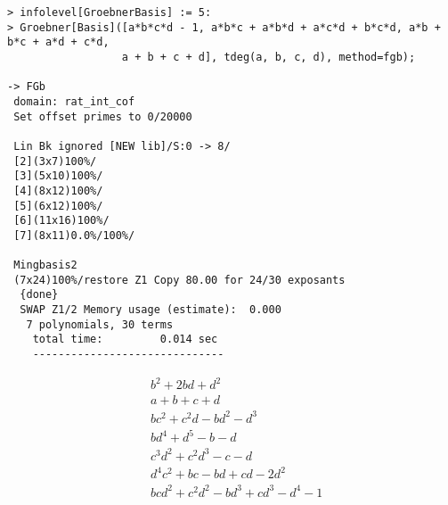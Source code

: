 \begin{Verbatim}[fontsize=\footnotesize]
> infolevel[GroebnerBasis] := 5:
> Groebner[Basis]([a*b*c*d - 1, a*b*c + a*b*d + a*c*d + b*c*d, a*b + b*c + a*d + c*d,
                  a + b + c + d], tdeg(a, b, c, d), method=fgb);

-> FGb
 domain: rat_int_cof
 Set offset primes to 0/20000

 Lin Bk ignored [NEW lib]/S:0 -> 8/
 [2](3x7)100%/
 [3](5x10)100%/
 [4](8x12)100%/
 [5](6x12)100%/
 [6](11x16)100%/
 [7](8x11)0.0%/100%/

 Mingbasis2
 (7x24)100%/restore Z1 Copy 80.00 for 24/30 exposants
  {done}
  SWAP Z1/2 Memory usage (estimate):  0.000
   7 polynomials, 30 terms
    total time:         0.014 sec
    ------------------------------
\end{Verbatim}
\begin{eqnarray*}
	&  b^2+2bd+d^2\\
	&  a+b+c+d\\
	&  bc^2+c^2d-bd^2-d^3\\
	&  bd^4+d^5-b-d\\
	&  c^3d^2+c^2d^3-c-d\\
	&  d^4c^2+bc-bd+cd-2d^2\\
	&  bcd^2+c^2d^2-bd^3+cd^3-d^4-1
\end{eqnarray*}
